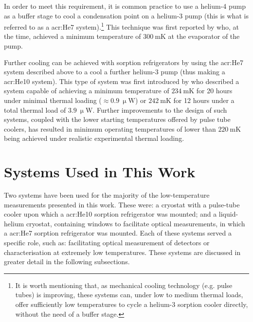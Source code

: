 \par 
In order to meet this requirement, it is common practice to use a helium-4 pump as a buffer stage to cool a condensation point on a helium-3 pump (this is what is referred to as a \gls{acr:He7} system).\footnote{It is worth mentioning that, as mechanical cooling technology (e.g. pulse tubes) is improving, these systems can, under low to medium thermal loads, offer sufficiently low temperatures to cycle a helium-3 sorption cooler directly, without the need of a buffer stage.} This technique was first reported by \textcite{DallOglio1991} who, at the time, achieved a minimum temperature of $300~\mathrm{mK}$ at the evaporator of the  pump.
\par 
Further cooling can be achieved with sorption refrigerators by using the \gls{acr:He7} system described above to a cool a further helium-3 pump (thus making a \gls{acr:He10} system). This type of system was first introduced by \textcite{Bhatia2000} who described a system capable of achieving a minimum temperature of $234~\mathrm{mK}$ for 20 hours under minimal thermal loading ($\approx 0.9~\mathrm{\upmu W}$) or $242~\mathrm{mK}$ for 12 hours under a total thermal load of $3.9~\mathrm{\upmu W}$. Further improvements to the design of such systems, coupled with the lower starting temperatures offered by pulse tube coolers, has resulted in minimum operating temperatures of lower than $220~\mathrm{mK}$ being achieved under realistic experimental thermal loading.
%
\section{Systems Used in This Work}\label{sec:cryostats}
Two systems have been used for the majority of the low-temperature measurements presented in this work. These were: a cryostat with a pulse-tube cooler upon which a \gls{acr:He10} sorption refrigerator was mounted; and a liquid-helium cryostat, containing  windows to facilitate optical measurements, in which a \gls{acr:He7} sorption refrigerator was mounted. Each of these systems served a specific role, such as: facilitating optical measurement of detectors or characterisation at extremely low temperatures. These systems are discussed in greater detail in the following subsections.
%
